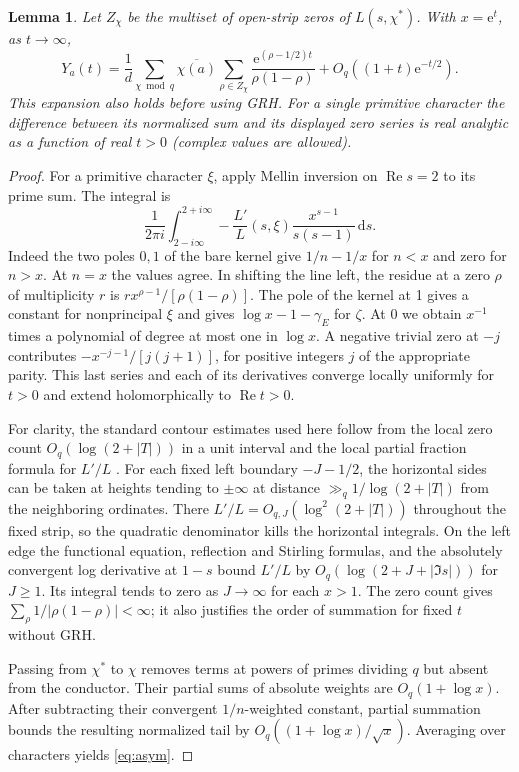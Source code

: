 \documentclass[11pt]{article}
\newtheorem{lemma}[theorem]{Lemma}
\newcommand{\dd}{\mathrm d}
\newcommand{\e}{\mathrm e}
\newcommand{\re}{\operatorname{Re}}
\begin{document}
\begin{lemma}\label{lem:ramp}
Let $Z_\chi$ be the multiset of open-strip zeros of $L(s,\chi^*)$. With $x=\e^t$, as $t\to\infty$,
\begin{equation}
Y_a(t)=\frac1d\sum_{\chi\bmod q}\overline{\chi(a)}
   \sum_{\rho\in Z_\chi}\frac{\e^{(\rho-1/2)t}}{\rho(1-\rho)}
  +O_q((1+t)\e^{-t/2}).\label{eq:asym}
\end{equation}
This expansion also holds before using GRH. For a single primitive character the difference between its normalized sum and its displayed zero series is real analytic as a function of real $t>0$ (complex values are allowed).
\end{lemma}
\begin{proof}
For a primitive character $\xi$, apply Mellin inversion on $\re s=2$ to its prime sum. The integral is
\begin{equation}
 \frac{1}{2\pi i}\int_{2-i\infty}^{2+i\infty}
 -\frac{L'}L(s,\xi)\frac{x^{s-1}}{s(s-1)}\,\dd s .\label{eq:mellin}
\end{equation}
Indeed the two poles $0,1$ of the bare kernel give $1/n-1/x$ for $n<x$ and zero for $n>x$. At $n=x$ the values agree. In shifting the line left, the residue at a zero $\rho$ of multiplicity $r$ is $r x^{\rho-1}/[\rho(1-\rho)]$. The pole of the kernel at 1 gives a constant for nonprincipal $\xi$ and gives $\log x-1-\gamma_E$ for $\zeta$. At 0 we obtain $x^{-1}$ times a polynomial of degree at most one in $\log x$. A negative trivial zero at $-j$ contributes $-x^{-j-1}/[j(j+1)]$, for positive integers $j$ of the appropriate parity. This last series and each of its derivatives converge locally uniformly for $t>0$ and extend holomorphically to $\re t>0$.

For clarity, the standard contour estimates used here follow from the local zero count $O_q(\log(2+|T|))$ in a unit interval and the local partial fraction formula for $L'/L$ \cite{dav}. For each fixed left boundary $-J-1/2$, the horizontal sides can be taken at heights tending to $\pm\infty$ at distance $\gg_q 1/\log(2+|T|)$ from the neighboring ordinates. There $L'/L=O_{q,J}(\log^2(2+|T|))$ throughout the fixed strip, so the quadratic denominator kills the horizontal integrals. On the left edge the functional equation, reflection and Stirling formulas, and the absolutely convergent log derivative at $1-s$ bound $L'/L$ by $O_q(\log(2+J+|\Im s|))$ for $J\ge1$. Its integral tends to zero as $J\to\infty$ for each $x>1$. The zero count gives $\sum_\rho1/|\rho(1-\rho)|<\infty$; it also justifies the order of summation for fixed $t$ without GRH.

Passing from $\chi^*$ to $\chi$ removes terms at powers of primes dividing $q$ but absent from the conductor. Their partial sums of absolute weights are $O_q(1+\log x)$. After subtracting their convergent $1/n$-weighted constant, partial summation bounds the resulting normalized tail by $O_q((1+\log x)/\sqrt x)$. Averaging over characters yields \eqref{eq:asym}.
\end{proof}
\end{document}
